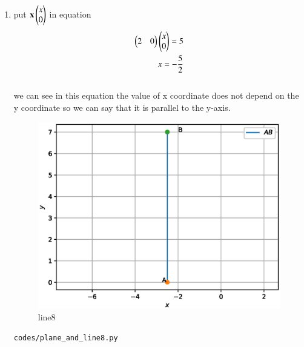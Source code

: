 \begin{enumerate}[label=\arabic*.,ref=\thesubsection.\theenumi]
\begin{enumerate}
\item put $\mathbf x \begin{pmatrix}x\\0\end{pmatrix}$ in equation 
\begin{align}
\begin{pmatrix}2 & 0\end{pmatrix}\begin{pmatrix}x\\0\end{pmatrix} = 5
\\
x= -\frac{5}{2}
\end{align}
\\
we can see in this equation the  value of x coordinate does not depend on the y coordinate so we can say that it is parallel to the y-axis.
\begin{figure}[!ht]
	\centering
	\includegraphics[width=\columnwidth]{./figures/plane_and_line8.eps}
	\caption{line8 }
	\label{fig:line8}
\end{figure}
\begin{lstlisting}
codes/plane_and_line8.py
\end{lstlisting} 
\end{enumerate}
\end{enumerate}